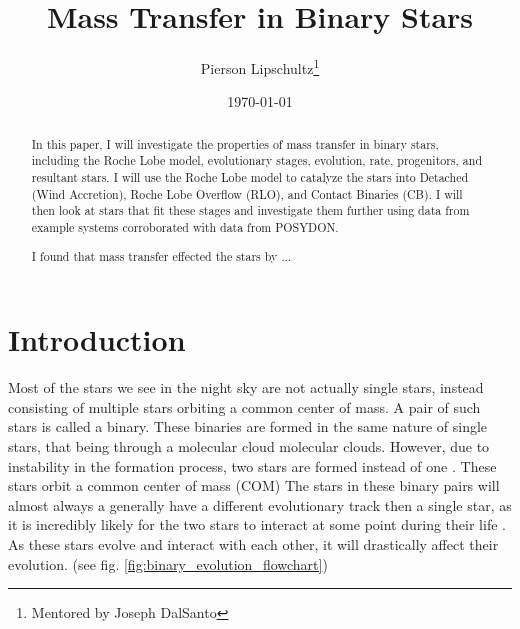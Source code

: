 \documentclass[12pt, letterpaper]{article}
\title{Mass Transfer in Binary Stars}
\author{Pierson Lipschultz\thanks{Mentored by Joseph DalSanto}}
\date{\today}
\begin{document}
\maketitle
\begin{abstract}
    \normalsize
    In this paper, I will investigate the properties of mass transfer in binary stars, including the Roche Lobe model, evolutionary stages, evolution, rate, progenitors, and resultant stars. I will use the Roche Lobe model to catalyze the stars into Detached (Wind Accretion), Roche Lobe Overflow (RLO), and Contact Binaries (CB). I will then look at stars that fit these stages and investigate them further using data from example systems corroborated with data from POSYDON.

    I found that mass transfer effected the stars by ... 
\end{abstract}

\pagebreak

\section{\centering Introduction} %

    Most of the stars we see in the night sky are not actually single stars, instead consisting of multiple stars orbiting a common center of mass. A pair of such stars is called a binary. These binaries are formed in the same nature of single stars, that being through a molecular cloud molecular clouds. However, due to instability in the formation process, two stars are formed instead of one \cite{Offner_2016}. These stars orbit a common center of mass (COM)  The stars in these binary pairs will almost always a generally have a different evolutionary track then a single star, as it is incredibly likely for the two stars to interact at some point during their life \cite{Fabry_2025}. As these stars evolve and interact with each other, it will drastically affect their evolution. (see fig. \ref{fig:binary_evolution_flowchart})
\end{document}
